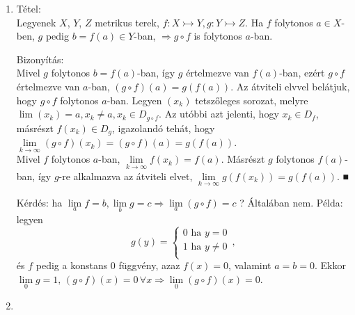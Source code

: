 \documentclass[12pt,a4paper]{scrartcl}
\newenvironment{tetel}{}{}
\newenvironment{bizonyitas}{}{}
\newenvironment{allitas}{}{}
\begin{document}
\begin{enumerate}
\def\labelenumi{\arabic{enumi}.}
\item
  \begin{tetel}

  Tétel:\\
  Legyenek \(X\), \(Y\), \(Z\) metrikus terek,
  \(\left. f:X\rightarrowtail Y,g:Y\rightarrowtail Z \right.\). Ha \(f\)
  folytonos \(a \in X\)-ben, \(g\) pedig
  \(b = f\left( a \right) \in Y\)-ban,
  \(\left. \Rightarrow g \circ f \right.\) is folytonos \(a\)-ban.

  \end{tetel}

  \begin{bizonyitas}

  Bizonyítás:\\
  Mivel \(g\) folytonos \(b = f\left( a \right)\)-ban, így \(g\)
  értelmezve van \(f\left( a \right)\)-ban, ezért \(g \circ f\)
  értelmezve van \(a\)-ban,
  \(\left( {g \circ f} \right)\left( a \right) = g\left( {f\left( a \right)} \right)\).
  Az átviteli elvvel belátjuk, hogy \(g \circ f\) folytonos \(a\)-ban.
  Legyen \(\left( x_{k} \right)\) tetszőleges sorozat, melyre
  \(\lim\left( x_{k} \right) = a,x_{k} \neq a,x_{k} \in D_{g \circ f}\).
  Az utóbbi azt jelenti, hogy \(x_{k} \in D_{f}\), másrészt
  \(f\left( x_{k} \right) \in D_{g}\), igazolandó tehát, hogy
  \(\underset{k\rightarrow\infty}{\lim}\left( {g \circ f} \right)\left( x_{k} \right) = \left( {g \circ f} \right)\left( a \right) = g\left( {f\left( a \right)} \right)\).\\
  Mivel \(f\) folytonos \(a\)-ban,
  \(\underset{k\rightarrow\infty}{\lim}f\left( x_{k} \right) = f\left( a \right)\).
  Másrészt \(g\) folytonos \(f\left( a \right)\)-ban, így \(g\)-re
  alkalmazva az átviteli elvet,
  \(\underset{k\rightarrow\infty}{\lim}g\left( {f\left( x_{k} \right)} \right) = g\left( {f\left( a \right)} \right)\).
  ■

  \end{bizonyitas}

  Kérdés: ha
  \(\left. \underset{a}{\lim}f = b,\underset{b}{\lim}g = c\Rightarrow\underset{a}{\lim}\left( {g \circ f} \right) = c \right.\)
  ? Általában nem. Példa: legyen
  \[g\left( y \right) = \left\{ \begin{matrix}
  {0\text{~ha~}y = 0\mspace{2mu}} \\
  {1\text{~ha~}y \neq 0} \\
  \end{matrix} \right.,\] és \(f\) pedig a konstans 0 függvény, azaz
  \(f\left( x \right) = 0\), valamint \(a = b = 0\). Ekkor
  \(\left. \lim\limits_{0}g = 1,\,\left( {g \circ f} \right)\left( x \right) = 0\,\forall x\Rightarrow\lim\limits_{0}\left( {g \circ f} \right)\left( x \right) = 0 \right.\).
\item
  \begin{allitas}


\end{allitas}
\end{enumerate}
\end{document}
